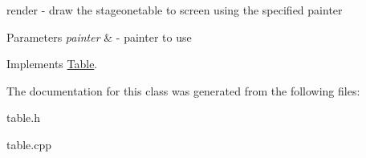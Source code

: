 render -\/ draw the stageonetable to screen using the specified painter 


\begin{DoxyParams}{Parameters}
{\em painter} & -\/ painter to use \\
\hline
\end{DoxyParams}


Implements \mbox{\hyperlink{class_table_a827dac18920a95b3e0ef006183514654}{Table}}.



The documentation for this class was generated from the following files\+:\begin{DoxyCompactItemize}
\item 
table.\+h\item 
table.\+cpp\end{DoxyCompactItemize}
